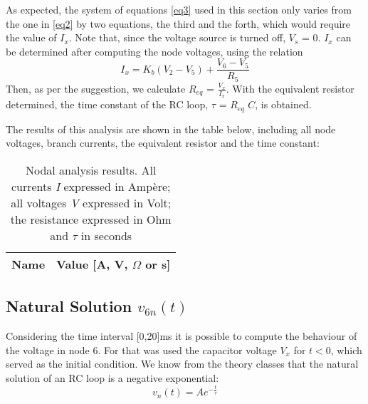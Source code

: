 As expected, the system of equations \ref{eq3} used in this section only varies from the one in \ref{eq2} by two equations, the third and the forth, which would require the value of $I_x$. Note that, since the voltage source is turned off, $V_s$ = 0.
$I_x$ can be determined after computing the node voltages, using the relation
\begin{equation}
    I_x = K_b(V_2 - V_5) + \frac{V_6 - V_5}{R_5}
\end{equation}
Then, as per the suggestion, we calculate $R_{eq}$ = $\frac{V_x}{I_x}$. With the equivalent resistor determined, the time constant of the RC loop, $\tau$ = $R_{eq}$ $C$, is obtained.

The results of this analysis are shown in the table below, including all node voltages, branch currents, the equivalent resistor and the time constant:

\begin{table}[h]                             

\centering                                  %
                        
\def\arraystretch{1.2}                       %


\begin{tabular}{c|c}                    %
\hline                                  %

\textbf{Name}  & \textbf{Value [A, V, $\Omega$ or s]}\\     

\hline                                %

\hline                                %
\end{tabular}   


\caption{Nodal analysis results. All currents \textit{I} expressed in Ampère; all voltages \textit{V} expressed in Volt; the resistance expressed in Ohm and $\tau$ in seconds }
\label{tab3}   
\end{table}                             
\FloatBarrier





\subsection{Natural Solution $v_{6n}(t)$}\label{sec2.3}

Considering the time interval [0,20]ms it is possible to compute the behaviour of the voltage in node 6. For that was used the capacitor voltage $V_x$ for $t<0$, which served as the initial condition. We know from the theory classes that the natural solution of an RC loop is a negative exponential:
\begin{equation}
    v_n(t) = Ae^{-\frac{t}{\tau}}
\end{equation}


